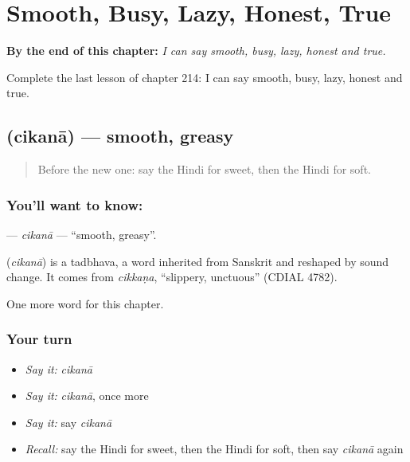 
\chapter{Smooth, Busy, Lazy, Honest, True}
\label{ch:hi-smooth-busy-lazy-honest-true}

\begin{chapteropening}
\textbf{By the end of this chapter:} \emph{I can say smooth, busy, lazy, honest and true.}

Complete the last lesson of chapter 214: I can say smooth, busy, lazy, honest and true.
\end{chapteropening}

\section[\texorpdfstring{\hi{चिकना} (cikanā)}{चिकना (cikanā)}]{ (cikanā) — smooth, greasy}

\label{lesson:HI-C214-cikana}



\begin{quote}
Before the new one: say the Hindi for sweet, then the Hindi for soft.
\end{quote}

\subsection*{You'll want to know: }
\textbf{} — \emph{cikanā} — \textquotedblleft{}smooth, greasy\textquotedblright{}.

\begin{cousinweb}
\textbf{} (\emph{cikanā}) is a tadbhava, a word inherited from Sanskrit and reshaped by sound change. It comes from \emph{cikkaṇa}, \textquotedblleft{}slippery, unctuous\textquotedblright{} (CDIAL 4782).
\end{cousinweb}

\begin{grammarlens}[title={What you've built}]
One more word for this chapter.
\end{grammarlens}

\subsection*{Your turn}
\begin{itemize}
\raggedright
  \item \emph{Say it:} \emph{cikanā}
  \item \emph{Say it:} \emph{cikanā}, once more
  \item \emph{Say it:} say \emph{cikanā}
  \item \emph{Recall:} say the Hindi for sweet, then the Hindi for soft, then say \emph{cikanā} again
\end{itemize}

